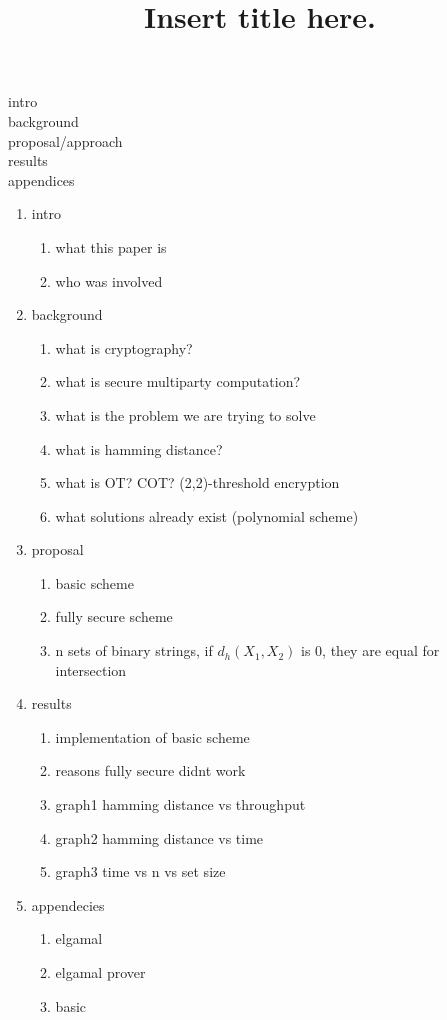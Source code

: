 \documentclass[10pt]{article}
\begin{document}
\title{Insert title here.}


intro
\\background
\\proposal/approach
\\results
\\appendices

\begin{enumerate}
\item intro
	\begin{enumerate}
	\item what this paper is
	\item who was involved
	\end{enumerate}
\item background
	\begin{enumerate}
	\item what is cryptography?
	\item what is secure multiparty computation?
	\item what is the problem we are trying to solve
	\item what is hamming distance?
	\item what is OT? COT? (2,2)-threshold encryption	
	\item what solutions already exist (polynomial scheme) 
	\end{enumerate}
\item proposal
	\begin{enumerate}
	\item basic scheme
	\item fully secure scheme
	\item n sets of binary strings, if $d_h(X_1,X_2)$ is 0, they are equal for intersection
	\end{enumerate}
\item results
	\begin{enumerate}
	\item implementation of basic scheme
	\item reasons fully secure didnt work
	\item graph1 hamming distance vs throughput
	\item graph2 hamming distance vs time
	\item graph3 time vs n vs set size
	\end{enumerate}
\item appendecies
	\begin{enumerate}
	\item elgamal
	\item elgamal prover
	\item basic

\end{enumerate}
\end{enumerate}
\end{document}
